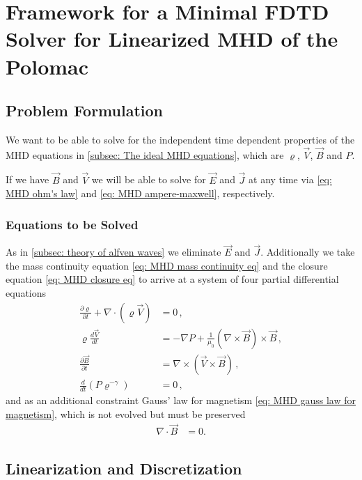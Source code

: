 \chapter{Framework for a Minimal FDTD Solver for Linearized MHD of the Polomac}
\label{chap: Framework for a Minimal FDTD Solver for Linearized MHD of the Polomac}

\section{Problem Formulation}
We want to be able to solve for the independent time dependent properties of the MHD equations in \autoref{subsec: The ideal MHD equations},
which are $\varrho$, $\vec{V}$, $\vec{B}$ and $P$.  

If we have $\vec{B}$ and $\vec{V}$ we will be able to solve for $\vec{E}$ and $\vec{J}$ at any time via \eqref{eq: MHD ohm's law} and \eqref{eq: MHD ampere-maxwell}, respectively.

\subsection{Equations to be Solved}
As in \autoref{subsec: theory of alfven waves} we eliminate $\vec{E}$ and $\vec{J}$.
Additionally we take the mass continuity equation \eqref{eq: MHD mass continuity eq} and the closure equation \eqref{eq: MHD closure eq}
to arrive at a system of four partial differential equations
\begin{align*}
    \frac{\partial \varrho}{\partial t} + \nabla \cdot (\varrho \vec{V}) &= 0  \, ,\\
    \varrho \frac{d\vec{V}}{dt} &= -\nabla P + \frac{1}{\mu_0}(\nabla \times \vec{B}) \times \vec{B}  \, ,\\
    \frac{\partial \vec{B}}{\partial t} &= \nabla \times (\vec{V} \times \vec{B})  \, , \\
    \frac{d}{dt}\!\left(P \varrho^{-\gamma}\right) &= 0  \, ,
\end{align*}
and as an additional constraint Gauss' law for magnetism \eqref{eq: MHD gauss law for magnetism},
which is not evolved but must be preserved
\begin{align}
    \label{eq: gauss magnetism constraint}
    \nabla \cdot \vec{B} &= 0.
\end{align}

\section{Linearization and Discretization}

